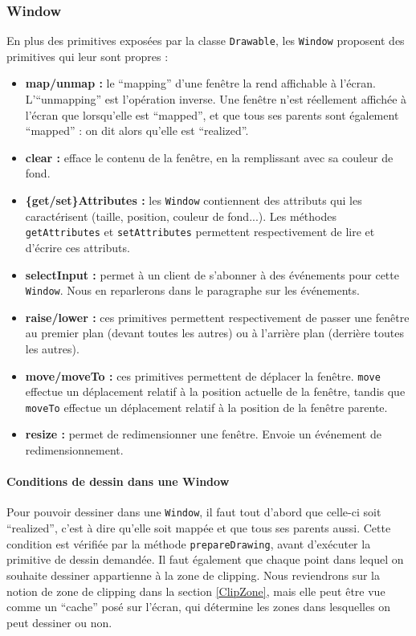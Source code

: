 \subsubsection{Window}

En plus des primitives exposées par la classe \verb|Drawable|, les \verb|Window| proposent des primitives qui leur sont propres :
\begin{itemize}
  \item \textbf{map/unmap :} le ``mapping'' d'une fenêtre la rend affichable à l'écran. L'``unmapping'' est l'opération inverse. Une fenêtre n'est réellement affichée à l'écran que lorsqu'elle est ``mapped'', et que tous ses parents sont également ``mapped'' : on dit alors qu'elle est ``realized''.
  \item \textbf{clear :} efface le contenu de la fenêtre, en la remplissant avec sa couleur de fond.
  \item \textbf{\{get/set\}Attributes :} les \verb|Window| contiennent des attributs qui les caractérisent (taille, position, couleur de fond...). Les méthodes \verb|getAttributes| et \verb|setAttributes| permettent respectivement de lire et d'écrire ces attributs.
  \item \textbf{selectInput :} permet à un client de s'abonner à des événements pour cette \verb|Window|. Nous en reparlerons dans le paragraphe sur les événements.
  \item \textbf{raise/lower :} ces primitives permettent respectivement de passer une fenêtre au premier plan (devant toutes les autres) ou à l'arrière plan (derrière toutes les autres).
  \item \textbf{move/moveTo :} ces primitives permettent de déplacer la fenêtre. \verb|move| effectue un déplacement relatif à la position actuelle de la fenêtre, tandis que \verb|moveTo| effectue un déplacement relatif à la position de la fenêtre parente.
  \item \textbf{resize :} permet de redimensionner une fenêtre. Envoie un événement de redimensionnement.
\end{itemize}

\paragraph{Conditions de dessin dans une Window}
Pour pouvoir dessiner dans une \verb|Window|, il faut tout d'abord que celle-ci soit ``realized'', c'est à dire qu'elle soit mappée et que tous ses parents aussi. Cette condition est vérifiée par la méthode \verb|prepareDrawing|, avant d'exécuter la primitive de dessin demandée. Il faut également que chaque point dans lequel on souhaite dessiner appartienne à la zone de clipping. Nous reviendrons sur la notion de zone de clipping dans la section \ref{ClipZone}, mais elle peut être vue comme un ``cache'' posé sur l'écran, qui détermine les zones dans lesquelles on peut dessiner ou non.

